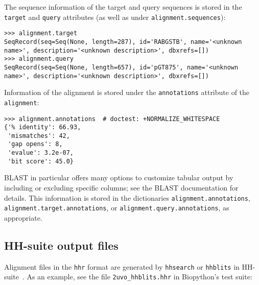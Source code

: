 The sequence information of the target and query sequences is stored in the \verb|target| and \verb|query| attributes (as well as under \verb|alignment.sequences|):
\begin{verbatim}
>>> alignment.target
SeqRecord(seq=Seq(None, length=287), id='RABGSTB', name='<unknown name>', description='<unknown description>', dbxrefs=[])
>>> alignment.query
SeqRecord(seq=Seq(None, length=657), id='pGT875', name='<unknown name>', description='<unknown description>', dbxrefs=[])
\end{verbatim}
Information of the alignment is stored under the \verb|annotations| attribute of the \verb|alignment|:
\begin{verbatim}
>>> alignment.annotations  # doctest: +NORMALIZE_WHITESPACE
{'% identity': 66.93,
 'mismatches': 42,
 'gap opens': 8,
 'evalue': 3.2e-07,
 'bit score': 45.0}
\end{verbatim}
BLAST in particular offers many options to customize tabular output by including or excluding specific columns; see the BLAST documentation for details. This information is stored in the dictionaries \verb|alignment.annotations|, \verb|alignment.target.annotations|, or \verb|alignment.query.annotations|, as appropriate.

\subsection{HH-suite output files}
\label{subsec:align_hhr}

Alignment files in the \verb|hhr| format are generated by \verb+hhsearch+ or \verb+hhblits+ in HH-suite~\cite{steinegger2019}.
As an example, see the file \verb+2uvo_hhblits.hhr+ in Biopython's test suite:


